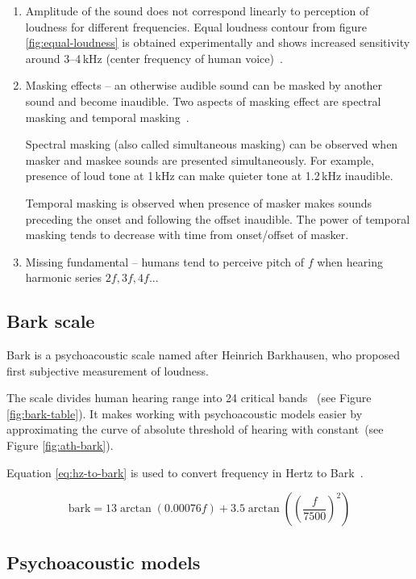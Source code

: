 \documentclass[english,bachelor,a4paper,oneside]{ppfcmthesis}
\begin{document}
\begin{enumerate}
\item Amplitude of the sound does not correspond linearly to perception of loudness for different frequencies. Equal loudness contour from figure \ref{fig:equal-loudness} is obtained experimentally and shows increased sensitivity around 3--4\,kHz (center frequency of human voice)~\cite{DigiCoding}\cite{DigiAudio}.

\item Masking effects -- an otherwise audible sound can be masked by another sound and become inaudible.
Two aspects of masking effect are spectral masking and temporal masking~\cite{ASP}.\label{itm:masking-effects}

Spectral masking (also called simultaneous masking) can be observed when masker and maskee sounds are presented simultaneously. For example, presence of loud tone at 1\,kHz can make quieter tone at 1.2\,kHz inaudible.

Temporal masking is observed when presence of masker makes sounds preceding the onset and following the offset inaudible. The power of temporal masking tends to decrease with time from onset/offset of masker.

\item Missing fundamental -- humans tend to perceive pitch of $f$ when hearing harmonic series $2f, 3f, 4f ...$
\end{enumerate}

\subsection{Bark scale}

Bark is a psychoacoustic scale named after Heinrich Barkhausen, who proposed first subjective measurement of loudness.

The scale divides human hearing range into 24 critical bands~\cite{Bark} (see Figure \ref{fig:bark-table}).
It makes working with psychoacoustic models easier by approximating the curve of absolute threshold of hearing with constant~(see Figure \ref{fig:ath-bark}).

Equation \ref{eq:hz-to-bark} is used to convert frequency in Hertz to Bark~\cite{Bark}.

\begin{equation}
\label{eq:hz-to-bark}
\textrm{bark} = 13\arctan(0.00076f) + 3.5\arctan((\frac{f}{7500})^{2})
\end{equation}

\subsection{Psychoacoustic models}
\label{subsec:psychoacoustic-model}
\end{document}
